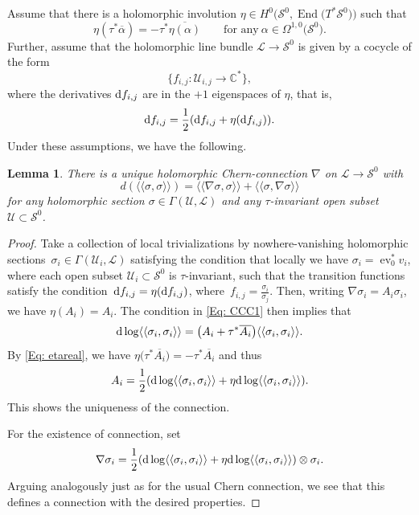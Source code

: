 \documentclass[pdftex]{sigma}
\numberwithin{equation}{section}
\newtheorem{Lemma}[Theorem]{Lemma}
\theoremstyle{definition}
\newcommand\C{{\mathbb C}}
\begin{document}
Assume that there is a holomorphic involution
$\eta \in H^0\bigl(\mathcal S^0, \operatorname{End}\bigl(T^*\mathcal S^0\bigr)\bigr)$
such that
\begin{equation}\label{Eq: etareal}
\eta(\tau^*\overline\alpha) = -\tau^*\overline{\eta(\alpha)}\qquad \text{for any}\ \alpha \in \Omega^{1,0}\bigl(\mathcal S^0\bigr) .
\end{equation}
Further, assume that the holomorphic line bundle $\mathcal L
 \longrightarrow \mathcal S^0$ is
given by a cocycle
of the form
\begin{equation}\label{taucocylce}\{f_{i,j}\colon \mathcal U_{i,j} \longrightarrow \C^*\},\end{equation}where the derivatives ${\rm d} f_{i,j}$ are in
the $+1$ eigenspaces of $\eta$, that is,
\[{\rm d}f_{i,j} = \frac{1}{2}( {\rm d}f_{i,j}+\eta ({\rm d}f_{i,j}) ).\]
Under these assumptions, we have the following.

\begin{Lemma}\label{Lemma: ccc}
There is a unique holomorphic {\em Chern}-connection
$\nabla$ on $\mathcal L \longrightarrow \mathcal S^0$ with
\begin{equation}\label{Eq: CCC1}
d (\langle\langle \sigma, \sigma\rangle\rangle) =
\langle\langle\nabla \sigma, \sigma\rangle \rangle+ \langle\langle \sigma, \nabla \sigma\rangle\rangle
\end{equation}
for any holomorphic section $\sigma \in \Gamma(\mathcal U, \mathcal L)$ and any
$\tau$-invariant open subset $\mathcal U \subset \mathcal S^0$.
\end{Lemma}

\begin{proof}
Take a collection of local trivializations by nowhere-vanishing holomorphic sections~$
\sigma_i \in \Gamma(\mathcal U_i, \mathcal L)$ satisfying the
condition that locally we have $\sigma_i
 = \operatorname{ev}_0^*v_i$, where each open subset $\mathcal U_i \subset {\mathcal S}^0$
is $\tau$-invariant, such that the
transition functions satisfy the condition~${{\rm d}f_{i,j} = \eta({\rm d}f_{i,j})}$, where~$f_{i,j} = \frac{\sigma_i}{\sigma_j}$. Then, writing
$
\nabla\sigma_i = A_i\sigma_i$,
we have $\eta(A_i) = A_i$. The condition in \eqref{Eq: CCC1} then implies that
\[
{\rm d}\log\langle\langle \sigma_i, \sigma_i\rangle\rangle =
 \bigl(A_i+ \tau^*\overline{A_i}\bigr)\langle\langle \sigma_i, \sigma_i\rangle\rangle.
\]
By \eqref{Eq: etareal}, we have $\eta\bigl(\tau^*\overline{A_i}\bigr) = -\tau^*\overline{A_i}$ and thus
\[
A_i = \frac{1}{2}({\rm d}\log\langle \langle \sigma_i, \sigma_i\rangle\rangle+
\eta {\rm d}\log \langle\langle \sigma_i, \sigma_i\rangle\rangle).
\]
This shows the uniqueness of the connection.

For the existence of connection, set
\[\nabla \sigma_i = \frac{1}{2}({\rm d}\log\langle \langle \sigma_i, \sigma_i\rangle\rangle+
\eta {\rm d}\log \langle\langle \sigma_i, \sigma_i\rangle\rangle)\otimes \sigma_i.\]
Arguing analogously just as for the usual Chern connection, we see that this defines a connection
with the desired properties.
\end{proof}
\end{document}

